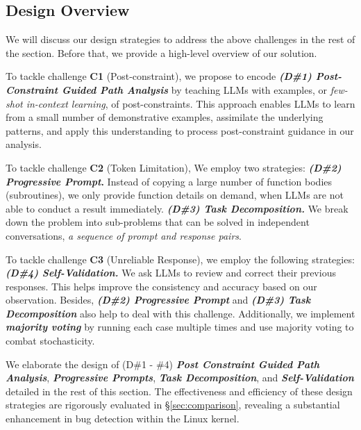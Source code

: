 \subsection{Design Overview}

We will discuss our design strategies to address the above challenges in the rest of the section. Before that, we provide a high-level overview of our solution.

\squishlist
\item To tackle challenge \textbf{C1} (Post-constraint), we propose to encode \textbf{\textit{(D\#1) Post-Constraint Guided Path Analysis}} by teaching LLMs with examples, or \textit{few-shot in-context learning}, of post-constraints.
This approach enables LLMs to learn from a small number of demonstrative examples, assimilate the underlying patterns, and apply this understanding to process post-constraint guidance in our analysis. 

\item  To tackle challenge \textbf{C2} (Token Limitation), We employ two strategies: 
 \textbf{\textit{(D\#2) Progressive Prompt}.} 
Instead of copying a large number of function bodies (\ie subroutines), we only provide function details on demand, \ie when LLMs are not able to conduct a result immediately.
 \textbf{\textit{(D\#3) Task Decomposition.}} We break down the problem into sub-problems that can be solved in independent conversations, \ie \textit{a sequence of prompt and response pairs}. 

\item To tackle challenge \textbf{C3} (Unreliable Response), we employ the following strategies: 
\textbf{\textit{(D\#4) Self-Validation.}} We ask LLMs to review and correct their previous responses. This helps improve the consistency and accuracy based on our observation. 
Besides, \textit{\textbf{(D\#2) Progressive Prompt}} and \textit{\textbf{(D\#3) Task Decomposition}} also help to deal with this challenge. Additionally, we implement \textit{\textbf{majority voting}} by running each case multiple times and use majority voting to combat stochasticity. 
\squishend



We elaborate the design of (D\#1 - \#4) \textit{\textbf{Post Constraint Guided Path Analysis}}, \textbf{\textit{Progressive Prompts}}, 
\textbf{\textit{Task Decomposition}}, and
\textbf{\textit{Self-Validation}} detailed in the rest of this section.
The effectiveness and efficiency of these design strategies are rigorously evaluated in \S\ref{sec:comparison}, revealing a substantial enhancement in bug detection within the Linux kernel.


